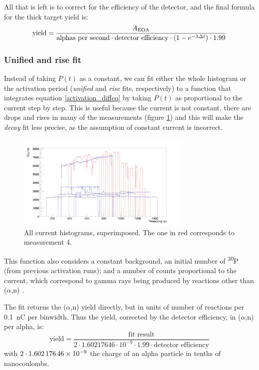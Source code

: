 \documentclass[a4paper,12pt]{report}
\newcommand{\an}{($\alpha$,n) }
\newcommand{\Piso}{\textsuperscript{30}P }
\begin{document}
All that is left is to correct for the efficiency of the detector, and the final formula for the thick target yield is:
\begin{equation}
	\text{yield} = \frac{A\textsubscript{EOA}}{\text{alphas per second} \cdot \text{detector efficiency} \cdot \left(1 - e^{-\lambda \Delta t} \right) \cdot 1.99}	%
\end{equation}

\subsubsection{Unified and rise fit}
Instead of taking $P(t)$ as a constant, we can fit either the whole histogram or the activation period (\textit{unified} and \textit{rise} fits, respectively) to a function that integrates equation \ref{activation_diffeq} by taking $P(t)$ as proportional to the current step by step.
This is useful because the current is not constant, there are drops and rises in many of the measurements (figure \ref{current_histograms}) and this will make the \textit{decay} fit less precise, as the assumption of constant current is incorrect.

\begin{figure}[H]
	\centering
	\includegraphics[width=0.75\textwidth]{current_histograms.png}
	\caption{All current histograms, superimposed.
	The one in red corresponds to measurement 4.}
	\label{current_histograms}
\end{figure}

This function also considers a constant background, an initial number of \Piso (from previous activation runs); and a number of counts proportional to the current, which correspond to gamma rays being produced by reactions other than \an.	%

The fit returns the \an yield directly, but in units of number of reactions per \qty{0.1}{\nano\coulomb} per binwidth.
Thus the yield, corrected by the detector efficiency, in \an per alpha, is:
\begin{equation}
	\text{yield} = \frac{\text{fit result}}{2\cdot1.60217646\cdot10^{-9}\cdot 1.99 \cdot \text{detector efficiency}}
\end{equation}
with $2\cdot\num{1.60217646E-9}$ the charge of an alpha particle in tenths of nanocoulombs.
\\
\end{document}
